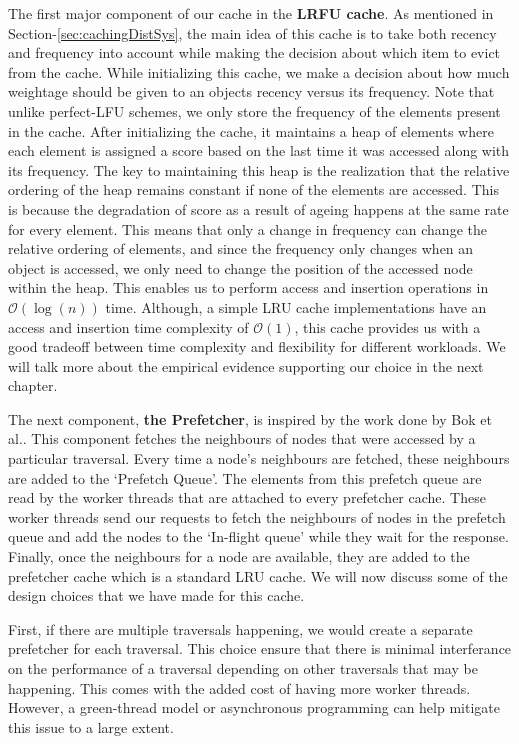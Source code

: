 \medskip
The first major component of our cache in the \textbf{LRFU
cache}\cite{lee2001lrfu}. As mentioned in Section-\ref{sec:cachingDistSys}, the
main idea of this cache is to take both recency and frequency into account while
making the decision about which item to evict from the cache. While initializing
this cache, we make a decision about how much weightage should be given to an
objects recency versus its frequency. Note that unlike perfect-LFU schemes, we
only store the frequency of the elements present in the cache. After
initializing the cache, it maintains a heap of elements where each element is
assigned a score based on the last time it was accessed along with its
frequency. The key to maintaining this heap is the realization that the relative
ordering of the heap remains constant if none of the elements are accessed. This
is because the degradation of score as a result of ageing happens at the same
rate for every element. This means that only a change in frequency can change
the relative ordering of elements, and since the frequency only changes when an
object is accessed, we only need to change the position of the accessed node
within the heap. This enables us to perform access and insertion operations in
$\mathcal{O}(\log(n))$ time. Although, a simple LRU cache implementations have an
access and insertion time complexity of $\mathcal{O}(1)$,  this cache provides 
us with a good tradeoff between time complexity and flexibility for 
different workloads. We will talk more about the empirical evidence supporting
our choice in the next chapter.

\medskip
The next component, \textbf{the Prefetcher}, is inspired by the work done
by Bok et al.\cite{bok2020memory}. This component fetches the neighbours of
nodes that were accessed by a particular traversal. Every time a node's
neighbours are fetched, these neighbours are added to the `Prefetch Queue'. The
elements from this prefetch queue are read by the worker threads that are
attached to every prefetcher cache. These worker threads send our requests to
fetch the neighbours of nodes in the prefetch queue and add the nodes to the
`In-flight queue' while they wait for the response. Finally, once the neighbours
for a node are available, they are added to the prefetcher cache which is a
standard LRU cache. We will now discuss some of the design choices that we have
made for this cache.

\medskip
First, if there are multiple traversals happening, we would create a separate
prefetcher for each traversal. This choice ensure that there is minimal
interferance on the performance of a traversal depending on other traversals
that may be happening. This comes with the added cost of having more worker
threads. However, a green-thread model or asynchronous programming can help
mitigate this issue to a large extent. 

